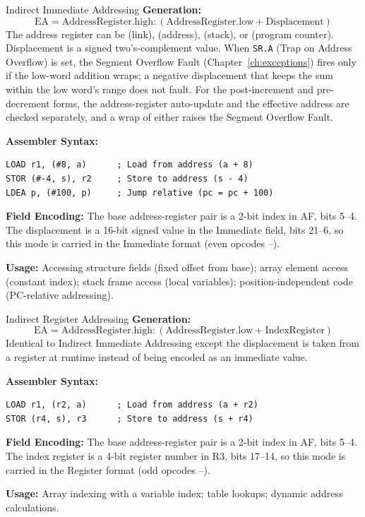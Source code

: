 \begin{addrmodebox}{Indirect Immediate Addressing}
	\textbf{Generation:}
	\begin{equation*}
		\text{EA} = \text{AddressRegister.high} : (\text{AddressRegister.low} + \text{Displacement})
	\end{equation*}
	The address register can be  (link),  (address),  (stack), or  (program counter).
	Displacement is a signed two's-complement value. When \texttt{SR.A} (Trap on Address Overflow) is set, the Segment
	Overflow Fault (Chapter~\ref{ch:exceptions}) fires only if the low-word addition wraps; a negative displacement that
	keeps the sum within the low word's range does not fault. For the post-increment and pre-decrement forms, the address-register auto-update and the effective address are checked separately, and a wrap of either raises the Segment Overflow Fault.

	\textbf{Assembler Syntax:}
	\begin{lstlisting}
LOAD r1, (#8, a)      ; Load from address (a + 8)
STOR (#-4, s), r2     ; Store to address (s - 4)
LDEA p, (#100, p)     ; Jump relative (pc = pc + 100)
	\end{lstlisting}

	\textbf{Field Encoding:} The base address-register pair is a 2-bit index in AF, bits 5--4. The displacement is a 16-bit signed value in the Immediate field, bits 21--6, so this mode is carried in the Immediate format (even opcodes --).

	\textbf{Usage:} Accessing structure fields (fixed offset from base); array element access (constant index);
	stack frame access (local variables); position-independent code (PC-relative addressing).
\end{addrmodebox}

\begin{addrmodebox}{Indirect Register Addressing}
	\textbf{Generation:}
	\begin{equation*}
		\text{EA} = \text{AddressRegister.high} : (\text{AddressRegister.low} + \text{IndexRegister})
	\end{equation*}
	Identical to Indirect Immediate Addressing except the displacement is taken from a register at runtime instead of
	being encoded as an immediate value.

	\textbf{Assembler Syntax:}
	\begin{lstlisting}
LOAD r1, (r2, a)      ; Load from address (a + r2)
STOR (r4, s), r3      ; Store to address (s + r4)
	\end{lstlisting}

	\textbf{Field Encoding:} The base address-register pair is a 2-bit index in AF, bits 5--4. The index register is a 4-bit register number in R3, bits 17--14, so this mode is carried in the Register format (odd opcodes --).

	\textbf{Usage:} Array indexing with a variable index; table lookups; dynamic address calculations.
\end{addrmodebox}

